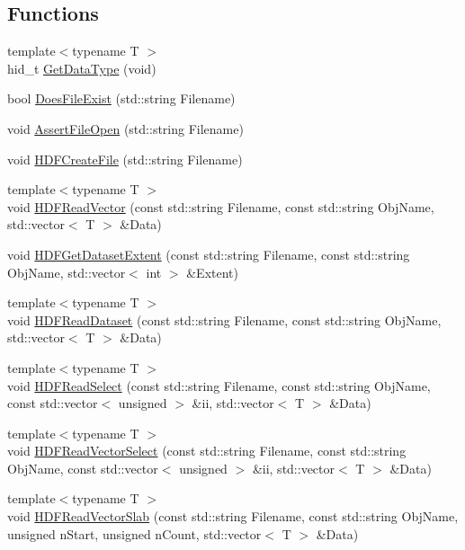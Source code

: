 \subsection*{Functions}
\begin{DoxyCompactItemize}
\item 
{\footnotesize template$<$typename T $>$ }\\hid\_\-t \hyperlink{HDFIO__new_8h_ae29c5c82995b302af2502eb19bb78490}{GetDataType} (void)
\item 
bool \hyperlink{HDFIO__new_8h_a5c60b85cf0c953cb2868ba5e01e66771}{DoesFileExist} (std::string Filename)
\item 
void \hyperlink{HDFIO__new_8h_a11e198795c8dc7e0753daa6b57083645}{AssertFileOpen} (std::string Filename)
\item 
void \hyperlink{HDFIO__new_8h_aa4eeddaee70eb3ce64662c7d5a0e3687}{HDFCreateFile} (std::string Filename)
\item 
{\footnotesize template$<$typename T $>$ }\\void \hyperlink{HDFIO__new_8h_a7a9e328246922cdfce8ad23cb4040e9b}{HDFReadVector} (const std::string Filename, const std::string ObjName, std::vector$<$ T $>$ \&Data)
\item 
void \hyperlink{HDFIO__new_8h_a285070bd55644602c9a8ac1830d44c39}{HDFGetDatasetExtent} (const std::string Filename, const std::string ObjName, std::vector$<$ int $>$ \&Extent)
\item 
{\footnotesize template$<$typename T $>$ }\\void \hyperlink{HDFIO__new_8h_aa9021278db454aa0b55e9d45db4d1732}{HDFReadDataset} (const std::string Filename, const std::string ObjName, std::vector$<$ T $>$ \&Data)
\item 
{\footnotesize template$<$typename T $>$ }\\void \hyperlink{HDFIO__new_8h_a7cb9cfc97460cc46d8958d73abf37401}{HDFReadSelect} (const std::string Filename, const std::string ObjName, const std::vector$<$ unsigned $>$ \&ii, std::vector$<$ T $>$ \&Data)
\item 
{\footnotesize template$<$typename T $>$ }\\void \hyperlink{HDFIO__new_8h_a5ad5843a221c83e26337a48786e1ef4f}{HDFReadVectorSelect} (const std::string Filename, const std::string ObjName, const std::vector$<$ unsigned $>$ \&ii, std::vector$<$ T $>$ \&Data)
\item 
{\footnotesize template$<$typename T $>$ }\\void \hyperlink{HDFIO__new_8h_a3a874f1791e49402424d5067b1d42182}{HDFReadVectorSlab} (const std::string Filename, const std::string ObjName, unsigned nStart, unsigned nCount, std::vector$<$ T $>$ \&Data)

\end{DoxyCompactItemize}
